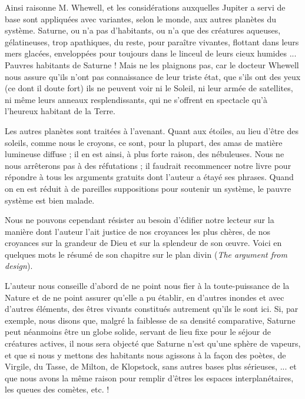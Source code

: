 \documentclass[a4paper, 11pt, oneside]{article}
\begin{document}
Ainsi raisonne M. Whewell, et les considérations auxquelles Jupiter a servi de base sont appliquées avec variantes, selon le monde, aux autres planètes du système. Saturne, ou n'a pas d'habitants, ou n'a que des créatures aqueuses, gélatineuses, trop apathiques, du reste, pour paraître vivantes, flottant dans leurs mers glacées, enveloppées pour toujours dans le linceul de leurs cieux humides ... Pauvres habitants de Saturne ! Mais ne les plaignons pas, car le docteur Whewell nous assure qu'ils n'ont pas connaissance de leur triste état, que s'ils ont des yeux (ce dont il doute fort) ils ne peuvent voir ni le Soleil, ni leur armée de satellites, ni même leurs anneaux resplendissants, qui ne s'offrent en spectacle qu'à l'heureux habitant de la Terre.

Les autres planètes sont traitées à l'avenant. Quant aux étoiles, au lieu d'être des soleils, comme nous le croyons, ce sont, pour la plupart, des amas de matière lumineuse diffuse ; il en est ainsi, à plus forte raison, des nébuleuses. Nous ne nous arrêterons pas à des réfutations ; il faudrait recommencer notre livre pour répondre à tous les arguments gratuits dont l'auteur a étayé ses phrases. Quand on en est réduit à de pareilles suppositions pour soutenir un système, le pauvre système est bien malade.

Nous ne pouvons cependant résister au besoin d'édifier notre lecteur sur la manière dont l'auteur l'ait justice de nos croyances les plus chères, de nos croyances sur la grandeur de Dieu et sur la splendeur de son œuvre. Voici en quelques mots le résumé de son chapitre sur le plan divin (\emph{The argument from design}).

L'auteur nous conseille d'abord de ne point nous fier à la toute-puissance de la Nature et de ne point assurer qu'elle a pu établir, en d'autres inondes et avec d'autres éléments, des êtres vivants constitués autrement qu'ils le sont ici. Si, par exemple, nous disons que, malgré la faiblesse de sa densité comparative, Saturne peut néanmoins être un globe solide, servant de lieu fixe pour le séjour de créatures actives, il nous sera objecté que Saturne n'est qu'une sphère de vapeurs, et que si nous y mettons des habitants nous agissons à la façon des poètes, de Virgile, du Tasse, de Milton, de Klopstock, sans autres bases plus sérieuses, ... et que nous avons la même raison pour remplir d'êtres les espaces interplanétaires, les queues des comètes, etc. !
\end{document}
